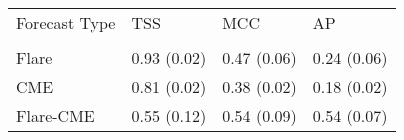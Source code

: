 \begin{tabular}{llll}
\toprule
Forecast Type & TSS & MCC & AP \\
 &  &  &  \\
\midrule
Flare & 0.93 (0.02) & 0.47 (0.06) & 0.24 (0.06) \\
CME & 0.81 (0.02) & 0.38 (0.02) & 0.18 (0.02) \\
Flare-CME & 0.55 (0.12) & 0.54 (0.09) & 0.54 (0.07) \\
\bottomrule
\end{tabular}
